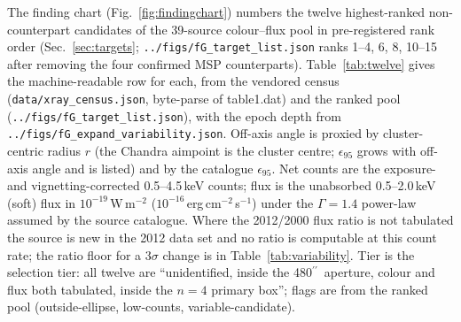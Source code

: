 \documentclass[11pt]{article}
\newcommand{\as}{\ensuremath{^{\prime\prime}}}
\begin{document}
The finding chart (Fig.~\ref{fig:findingchart}) numbers the twelve highest-ranked non-counterpart candidates of the 39-source colour--flux pool in pre-registered rank order (Sec.~\ref{sec:targets}; \texttt{../figs/fG\_target\_list.json} ranks 1--4, 6, 8, 10--15 after removing the four confirmed MSP counterparts). Table~\ref{tab:twelve} gives the machine-readable row for each, from the vendored census (\texttt{data/xray\_census.json}, byte-parse of \citet{Henleywillis2018} table1.dat) and the ranked pool (\texttt{../figs/fG\_target\_list.json}), with the epoch depth from \texttt{../figs/fG\_expand\_variability.json}. Off-axis angle is proxied by cluster-centric radius $r$ (the Chandra aimpoint is the cluster centre; $\epsilon_{95}$ grows with off-axis angle and is listed) and by the catalogue $\epsilon_{95}$. Net counts are the exposure- and vignetting-corrected 0.5--4.5\,keV counts; flux is the unabsorbed 0.5--2.0\,keV (soft) flux in $10^{-19}$\,W\,m$^{-2}$ ($10^{-16}$\,erg\,cm$^{-2}$\,s$^{-1}$) under the $\Gamma=1.4$ power-law assumed by the source catalogue. Where the 2012/2000 flux ratio is not tabulated the source is new in the 2012 data set and no ratio is computable at this count rate; the ratio floor for a $3\sigma$ change is in Table~\ref{tab:variability}. Tier is the selection tier: all twelve are ``unidentified, inside the 480\as\ aperture, colour and flux both tabulated, inside the $n=4$ primary box''; flags are from the ranked pool (outside-ellipse, low-counts, variable-candidate).
\end{document}

